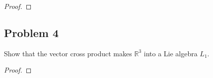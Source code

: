 \documentclass{article}
\theoremstyle{definition}
\newcommand{\R}{\mathbb{R}}
\begin{document}
\begin{proof}
\end{proof}


\subsection*{Problem 4}

\begin{tcolorbox}
Show that the vector cross product makes $\R^3$ into a Lie algebra $L_1$.
\end{tcolorbox}

\begin{proof}
\end{proof}
\end{document}
